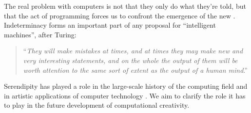 The real problem with computers is not that they only do what they're
told, but that the act of programming forces us to confront the
emergence of the new \cite{mead1932philosophy}.
%
Indeterminacy forms an important part of any proposal for
``intelligent machines'', after Turing:
\begin{quote}
``\emph{They will make mistakes at times, and at times they may make
    new and very interesting statements, and on the whole the output
    of them will be worth attention to the same sort of extent as the
    output of a human mind}.''  \cite{turing-intelligent}
\end{quote}

Serendipity has played a role in the large-scale history of the
computing field \cite{de2013turing} and in artistic applications of
computer technology \cite{reichardt1969cybernetic}.  We aim to clarify
the role it has to play in the future development of computational
creativity.




